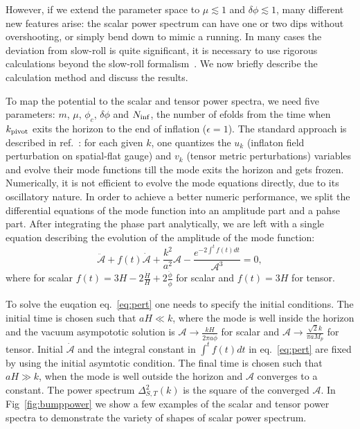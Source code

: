 \documentclass[11pt]{article}
\begin{document}
However, if we extend the parameter space to $\mu \lesssim 1$ and $\delta\phi \lesssim 1$, many different new features arise: the scalar power spectrum can have one or two dips without overshooting, or simply bend down to mimic a running. In many cases the deviation from slow-roll is quite significant, it is necessary to use rigorous calculations beyond the slow-roll formalism~\cite{Bardeen1983, Abbott1984,Stewart1993}. We now briefly describe the calculation method and discuss the results.

To map the potential to the scalar and tensor power spectra, we need five parameters: $m$, $\mu$, $\phi_c$, $\delta\phi$ and $N_{\rm inf}$, the number of efolds from the time when $k_{\rm pivot}$ exits the horizon to the end of inflation ($\epsilon = 1$). The standard approach is described in ref.~\cite{Stewart1993}: for each given $k$, one  quantizes the $u_k$ (inflaton field perturbation on spatial-flat gauge) and $v_k$ (tensor metric perturbations) variables and evolve their mode functions till the mode exits the horizon and gets frozen. Numerically, it is not efficient to evolve the mode equations directly, due to its oscillatory nature. In order to achieve a better numeric performance, we split the differential equations of the mode function into an amplitude part and a pahse part. After integrating the phase part analytically, we are left with a single equation describing the evolution of the amplitude of the mode function:
\begin{equation}
  \ddot{\mathcal{A}} + f(t) \dot{\mathcal{A}} + \frac{k^2}{a^2} \mathcal{A} - \frac{e^{-2\int^t f(t) dt}}{\mathcal{A}^3}  = 0, \label{eq:pert}
\end{equation}
where for scalar $f(t) = 3 H - 2 \frac{\dot H}{H} + 2 \frac{\ddot\phi}{\dot\phi}$ for scalar and $f(t) = 3H$ for tensor. 

To solve the euqation eq.~\eqref{eq:pert} one needs to specify the initial conditions. The initial time is chosen such that $aH\ll k$, where the mode is well inside the horizon and the vacuum asympototic solution is $\mathcal{A} \rightarrow \frac{k H }{2\pi a\dot\phi}$ for scalar and $\mathcal{A} \rightarrow \frac{\sqrt{2}k}{\pi a M_p}$ for tensor.  Initial $\dot{\mathcal{A}}$ and the integral constant in $\int^t f(t) dt$ in eq.~\eqref{eq:pert} are fixed by using the initial asymtotic condition.  The final time is chosen such that $aH\gg k$, when the mode is well outside the horizon and $\mathcal{A}$ converges to a constant.  The power spectrum $\Delta^2_{S,T}(k)$ is the square of the converged $\mathcal{A}$. In Fig~\ref{fig:bumppower} we show a few examples of the scalar and tensor power spectra to demonstrate the variety of shapes of scalar power spectrum. 
\end{document}
